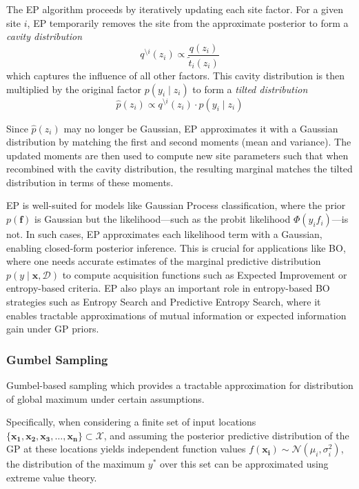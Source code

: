 \documentclass{ut-thesis}
\begin{document}
The EP algorithm proceeds by iteratively updating each site factor. For a given site $i$, EP temporarily removes the site from the approximate posterior to form a \emph{cavity distribution}
\begin{equation}
    q^{\setminus i}(z_i) \propto \frac{q(z_i)}{\tilde{t}_i(z_i)}
\end{equation}
which captures the influence of all other factors. This cavity distribution is then multiplied by the original factor $p(y_i \mid z_i)$ to form a \emph{tilted distribution}
\begin{equation}
    \hat{p}(z_i) \propto q^{\setminus i}(z_i) \cdot p(y_i \mid z_i)
\end{equation}

Since $\hat{p}(z_i)$ may no longer be Gaussian, EP approximates it with a Gaussian distribution by matching the first and second moments (mean and variance). The updated moments are then used to compute new site parameters such that when recombined with the cavity distribution, the resulting marginal matches the tilted distribution in terms of these moments. 

EP is well-suited for models like Gaussian Process classification, where the prior $p(\mathbf{f})$ is Gaussian but the likelihood—such as the probit likelihood $\Phi(y_i f_i)$—is not. In such cases, EP approximates each likelihood term with a Gaussian, enabling closed-form posterior inference. This is crucial for applications like BO, where one needs accurate estimates of the marginal predictive distribution $p(y \mid \mathbf{x}, \mathcal{D})$ to compute acquisition functions such as Expected Improvement or entropy-based criteria. EP also plays an important role in entropy-based BO strategies such as Entropy Search and Predictive Entropy Search, where it enables tractable approximations of mutual information or expected information gain under GP priors.

\subsubsection{Gumbel Sampling}

Gumbel-based sampling which provides a tractable approximation for distribution of global maximum under certain assumptions\cite{wang2017max}. 

Specifically, when considering a finite set of input locations \( \{\mathbf{x_1}, \mathbf{x_2}, \mathbf{x_3}, \dots, \mathbf{x_n}\} \subset \mathcal{X} \), and assuming the posterior predictive distribution of the GP at these locations yields independent function values \( f(\mathbf{x_i}) \sim \mathcal{N}(\mu_i, \sigma_i^2) \), the distribution of the maximum \( y^* \) over this set can be approximated using extreme value theory.
\end{document}
